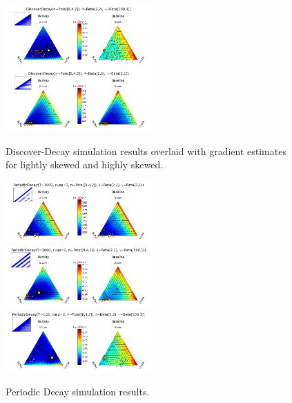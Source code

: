 \documentclass{cidr-2019}
\begin{document}
\begin{figure}[!htb]
\begin{center}
\includegraphics[width=0.5\textwidth]{discdecquiv2.png}
\includegraphics[width=0.5\textwidth]{discdecquiv1.png}
\end{center}
\caption{Discover-Decay simulation results overlaid with gradient estimates for
    lightly skewed and highly skewed.}
\end{figure}

\begin{figure}[!htb]
\begin{center}
\includegraphics[width=0.5\textwidth]{periodquiv3.png}
\includegraphics[width=0.5\textwidth]{periodquiv2.png}
\includegraphics[width=0.5\textwidth]{periodquiv1.png}
\end{center}
\caption{Periodic Decay simulation results.}
\end{figure}
\end{document}
